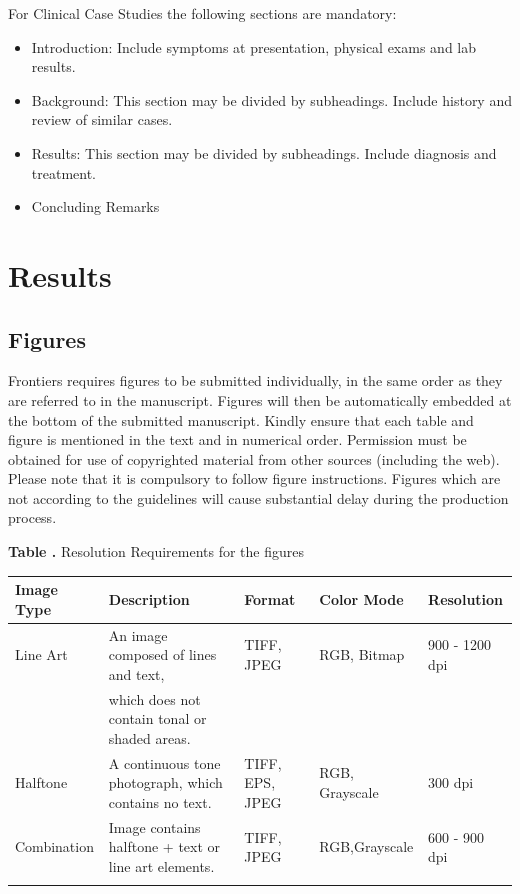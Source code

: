 \documentclass{frontiersSCNS} %
\begin{document}
For Clinical Case Studies the following sections are mandatory:

\begin{itemize}
\item Introduction: Include symptoms at presentation, physical exams and lab results.
\item Background: This section may be divided by subheadings. Include history and review of similar cases.
\item Results: This section may be divided by subheadings. Include diagnosis and treatment.
\item Concluding Remarks
\end{itemize}




\section{Results}

\subsection{Figures}
Frontiers requires figures to be submitted individually, in the same order as they are referred to in the manuscript. Figures will then be automatically embedded at the bottom of the submitted manuscript. Kindly ensure that each table and figure is mentioned in the text and in numerical order. Permission must be obtained for use of copyrighted material from other sources (including the web). Please note that it is compulsory to follow figure instructions. Figures which are not according to the guidelines will cause substantial delay during the production process.


\begin{table}[!t]
\textbf{\label{Tab:02} Table .}{ Resolution Requirements for the figures}

\processtable{}
{\begin{tabular}{lllll}\toprule
Image Type & Description & Format & Color Mode & Resolution\\\midrule
Line Art & An image composed of lines and text,  & TIFF, JPEG & RGB, Bitmap & 900 - 1200 dpi\\
           & which does not contain tonal or shaded areas.& & &\\
           Halftone & A continuous tone photograph, which contains no text. & TIFF, EPS, JPEG & RGB, Grayscale & 300 dpi\\
Combination & Image contains halftone + text or line art elements. & TIFF, JPEG & RGB,Grayscale & 600 - 900 dpi\\\botrule
\end{tabular}}{}
\end{table}
\end{document}
